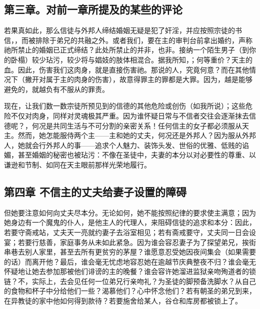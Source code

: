 
\subsection{第三章。对前一章所提及的某些的评论}

若果真如此，那么信徒与外邦人缔结婚姻无疑是犯了奸淫，并应按照宗徒的书信，，而被排除于弟兄的共融之外。或者我们，要在主的审判台前拿出婚约，声称祂所禁止的婚姻已正式缔结？此处所禁止的并非，也非。接纳一个陌生男子（到你的卧榻）较少玷污，较少将与娼妓的肢体相混合。据我所知，；何等重价？天主的血。因此，伤害我们这肉身，就是直接伤害祂。那说的人，究竟何意？而在其他情况下（撇开对属于主的肉身的伤害），故意得罪主的罪都是大罪。因为，越是能够避免的，就越负有不服从的罪责。\par

现在，让我们数一数宗徒所预见到的信德的其他危险或创伤（如我所说）；这些危险不仅对肉身，同样对灵魂极其严重。因为谁怀疑日常与不信者交往会逐渐抹去信德呢？，何况是共同生活与不可分割的亲密关系！任何信主的女子都必须服从天主。然而，她怎能服侍两个主——主和她的丈夫，何况还是外邦人？因为服从外邦人，她就会行外邦人的事——追求个人魅力、装饰头发、世俗的优雅、低贱的谄媚，甚至婚姻的秘密也被玷污：不像在圣徒中，夫妻的本分以对必要性的尊重、以谦逊和节制、如同在天主眼前那样光荣地履行。\par


\subsection{第四章 不信主的丈夫给妻子设置的障碍}

但她要注意如何向丈夫尽本分。无论如何，她不能按照纪律的要求使主满意；因为她身边有一个魔鬼的仆人，是他主人的代理人，来阻碍信徒的追求和本分：因此，若要守斋戒站，丈夫天一亮就约妻子去浴室相见；若有斋戒要守，丈夫同一日会设宴；若要行慈善，家庭事务从未如此紧急。因为谁会容忍妻子为了探望弟兄，挨街串巷去别人家里，甚至去所有更贫穷的茅屋？谁愿意忍受她因夜间集会（如果需要的话）而离开他？最后，谁会毫无忧虑地容忍她在逾越节庆典整夜不归？谁会毫无怀疑地让她去参加那被他们诽谤的主的晚餐？谁会容许她溜进监狱亲吻殉道者的锁链？不，实际上，去会见任何一位弟兄行亲吻礼？为圣徒的脚预备洗脚水？从自己的食物和杯子中分给他们一些？渴慕他们？心中怀念他们？若有朝圣的弟兄到来，在异教徒的家中他如何得到款待？若要施舍给某人，谷仓和库房都被锁上了。\par

